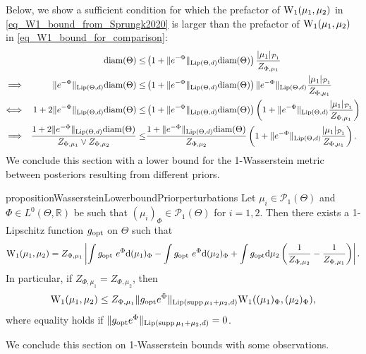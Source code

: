 \documentclass[a4paper]{scrartcl}
\theoremstyle{definition}
\numberwithin{equation}{section}
\newcommand{\R}{\mathbb{R}}
\newcommand{\rd}{\mathrm{d}}
\newcommand{\diam}[1]{\textup{diam}({#1})}
\DeclareMathOperator{\supp}{supp}
\newcommand{\abs}[1]{\vert #1\vert}
\newcommand{\Abs}[1]{\left\vert#1\right\vert}
\newcommand{\norm}[1]{\Vert #1 \Vert}
\newcommand{\Lip}[0]{\textup{Lip}}
\newcommand{\Was}[0]{\textup{W}}
\newcommand{\opt}[0]{\textup{opt}}
\begin{document}
Below, we show a sufficient condition for which the prefactor of $\Was_1(\mu_1,\mu_2)$ in \eqref{eq_W1_bound_from_Sprungk2020} is larger than the prefactor of $\Was_1(\mu_1,\mu_2)$ in \eqref{eq_W1_bound_for_comparison}:
\begin{align*}
& & \diam{\Theta}\leq & \left(1+\norm{e^{-\Phi}}_{\Lip(\Theta,d)}\diam{\Theta}\right)\frac{\abs{\mu_1}_{\mathcal{P}_1}}{Z_{\Phi,\mu_1}}
\\
\Longrightarrow & & \norm{e^{-\Phi}}_{\Lip(\Theta,d) }\diam{\Theta}\leq &  \left(1+\norm{e^{-\Phi}}_{\Lip(\Theta,d)}\diam{\Theta}\right)\norm{e^{-\Phi}}_{\Lip(\Theta,d)}\frac{\abs{\mu_1}_{\mathcal{P}_1}}{Z_{\Phi,\mu_1}}
\\
\Longleftrightarrow & & 1+2\norm{e^{-\Phi}}_{\Lip(\Theta,d) }\diam{\Theta}\leq &  \left(1+\norm{e^{-\Phi}}_{\Lip(\Theta,d)}\diam{\Theta}\right)\left(1+\norm{e^{-\Phi}}_{\Lip(\Theta,d)}\frac{\abs{\mu_1}_{\mathcal{P}_1}}{Z_{\Phi,\mu_1}}\right)
\\
\Longrightarrow & & \frac{1+2\norm{e^{-\Phi}}_{\Lip(\Theta,d)}\diam{\Theta}}{Z_{\Phi,\mu_1}\vee Z_{\Phi,\mu_2}} \leq &  \frac{1+\norm{e^{-\Phi}}_{\Lip(\Theta,d)}\diam{\Theta}}{Z_{\Phi,\mu_2}}\left(1+\norm{e^{-\Phi}}_{\Lip(\Theta,d)}\frac{\abs{\mu_1}_{\mathcal{P}_1}}{Z_{\Phi,\mu_1}}\right).
\end{align*}
We conclude this section with a lower bound for the 1-Wasserstein metric between posteriors resulting from different priors.
\begin{restatable}{proposition}{WassersteinLowerboundPriorperturbations}
 \label{proposition_W1_lower_bound_prior_perturbations}
 Let $\mu_i\in\mathcal{P}_1(\Theta)$ and $\Phi\in L^0(\Theta,\R)$ be such that $(\mu_i)_\Phi\in\mathcal{P}_1(\Theta)$ for $i=1,2$.
 Then there exists a 1-Lipschitz function $g_\opt$ on $\Theta$ such that
 \begin{equation*}
  \Was_1(\mu_1,\mu_2)=Z_{\Phi,\mu_1} \Abs{\int g_\opt ~e^\Phi \rd (\mu_1)_\Phi-\int g_\opt ~ e^\Phi \rd (\mu_2)_\Phi+\int g_\opt \rd \mu_2\left(\frac{1}{Z_{\Phi,\mu_2}}-\frac{1}{Z_{\Phi,\mu_1}}\right)}.
 \end{equation*}
In particular, if $Z_{\Phi,\mu_1}=Z_{\Phi,\mu_2}$, then 
 \begin{equation*}
  \Was_1(\mu_1,\mu_2)\leq Z_{\Phi,\mu_1}\norm{g_\opt e^\Phi}_{\Lip(\supp{\mu_1+\mu_2},d)}\Was_1((\mu_1)_\Phi,(\mu_2)_\Phi),
 \end{equation*}
 where equality holds if $\norm{g_\opt e^\Phi}_{\Lip(\supp{\mu_1+\mu_2},d)}=0$.
\end{restatable}
We conclude this section on 1-Wasserstein bounds with some observations.
\end{document}
